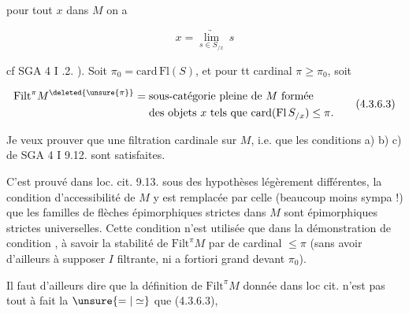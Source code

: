 
pour tout $x$ dans $M$ on a

\[
x=\underset{s\in S_{/x}}{\underrightarrow{\lim}}\ s
\tag*{(4.3.6.2)}
\]

cf SGA 4 I .2. ). Soit $\pi_0=\mathrm{card}\,\mathrm{Fl}(S)$,  et pour tt cardinal $\pi\geq\pi_0$, soit

\[
\begin{aligned}
\mathrm{Filt}^{\pi}M^{\deleted{\unsure{\pi}}}
&=\text{sous-catégorie pleine de }M\text{ formée}\\
&\phantom{{}={}}\text{des objets }x\text{ tels que }\mathrm{card}(\mathrm{Fl}\,S_{/x})\leq\pi.
\end{aligned}
\tag*{(4.3.6.3)}
\]

Je veux prouver que   une filtration cardinale sur $M$, i.e. que les conditions a) b) c) de SGA 4 I 9.12. sont satisfaites.

C'est prouvé dans loc. cit. 9.13. sous des  hypothèses légèrement différentes, la condition d'accessibilité de $M$ y est remplacée par celle  (beaucoup moins sympa !) que les familles de flèches épimorphiques strictes dans $M$ sont épimorphiques strictes universelles. Cette condition n'est utilisée que dans la démonstration de  condition , à savoir la stabilité de $\mathrm{Filt}^\pi M$ par   de cardinal $\leq\pi$ (sans avoir d'ailleurs à supposer $I$ filtrante, ni a fortiori grand devant $\pi_0$).

Il faut d'ailleurs dire que la définition de $\mathrm{Filt}^\pi M$ donnée dans loc cit. n'est pas tout à fait la $\unsure{=|\simeq}$ que (4.3.6.3),

